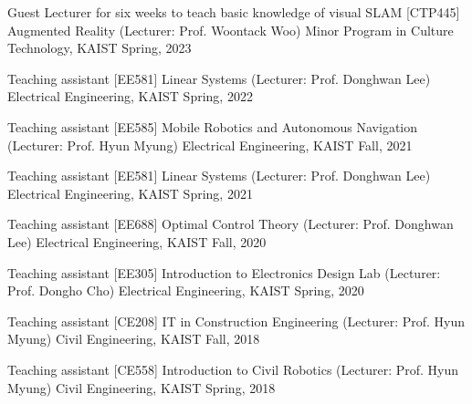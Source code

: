 

\begin{cventries}

  \cventry
    {Guest Lecturer for six weeks to teach basic knowledge of visual SLAM} %
    {[CTP445] Augmented Reality (Lecturer: Prof. Woontack Woo)} %
    {Minor Program in Culture Technology, KAIST} %
    {Spring, 2023} %
    {}

  \cventry
    {Teaching assistant} %
    {[EE581] Linear Systems (Lecturer: Prof. Donghwan Lee)} %
    {Electrical Engineering, KAIST} %
    {Spring, 2022} %
    {}

  \cventry
    {Teaching assistant} %
    {[EE585] Mobile Robotics and Autonomous Navigation (Lecturer: Prof. Hyun Myung)} %
    {Electrical Engineering, KAIST} %
    {Fall, 2021} %
    {
    }

  \cventry
    {Teaching assistant} %
    {[EE581] Linear Systems (Lecturer: Prof. Donghwan Lee)} %
    {Electrical Engineering, KAIST} %
    {Spring, 2021} %
    {
    }

  \cventry
    {Teaching assistant} %
    {[EE688] Optimal Control Theory (Lecturer: Prof. Donghwan Lee)} %
    {Electrical Engineering, KAIST} %
    {Fall, 2020} %
    {
    }

  \cventry
    {Teaching assistant} %
    {[EE305] Introduction to Electronics Design Lab (Lecturer: Prof. Dongho Cho)} %
    {Electrical Engineering, KAIST} %
    {Spring, 2020} %
    {
    }

   \cventry
    {Teaching assistant} %
    {[CE208] IT in Construction Engineering (Lecturer: Prof. Hyun Myung)} %
    {Civil Engineering, KAIST} %
    {Fall, 2018} %
    {
    }

  \cventry
    {Teaching assistant} %
    {[CE558] Introduction to Civil Robotics (Lecturer: Prof. Hyun Myung)} %
    {Civil Engineering, KAIST} %
    {Spring, 2018} %
    {
    }
\end{cventries}
